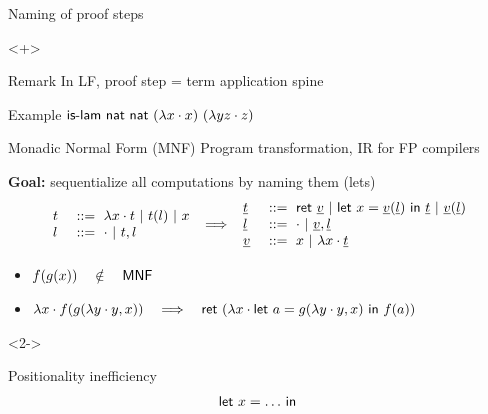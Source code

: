\documentclass[ignorenonframetext,red]{beamer}
\begin{document}
\begin{frame}{Naming of proof steps}
  \begin{onlyenv}<+>
    \begin{block}{Remark}
      In LF, proof step = term application spine

      \textcolor{green!50!black}{Example} $ \text{\textsf{is-lam}}\
      \mathsf{nat}\ \mathsf{nat}\ (\lambda{x}\cdot x)\ (\lambda{y z}\cdot z) $
    \end{block}

    \begin{block}{Monadic Normal Form (\textsf{MNF})}
      Program transformation, IR for FP compilers

      \textbf{Goal:} sequentialize all computations by naming them
      (\textsf{let}s)
      \[
      \inXLF
      \begin{array}{ll}
        \mo &\gequal \ulam\mv\mo \gor \lapp\mo\ma \gor \mv \\
        \ma &\gequal \lnil \gor \lcons\mo\ma \\
      \end{array}
      \ \Longrightarrow\ \inXLFa
      \begin{array}{ll}
        \mo &\gequal \ret\mval \gor \letb\mv{\lapp\mval\ma}\mo \gor \lapp\mval\ma \\
        \ma &\gequal \lnil \gor \lcons\mval\ma \\
        \mval &\gequal \mv \gor \ulam\mv\mo
      \end{array}
      \]
      \begin{examples}
        \begin{itemize}
        \item $\inXLFa \lapp f {\lapp g {\lsing x}} \quad\notin\quad
          \mathsf{MNF}$
        \item $\lambda{x}\cdot {f}({{{g}({{\lambda{y}\cdot
                  y},{{x}}})}}) \quad\Longrightarrow\quad
          \textsf{ret}\ {(\lambda{x}\cdot \mathsf{let}\ {a}={{{g}({{\lambda{y}\cdot y},{{x}}})}}\ \mathsf{in}\  {f}({{a}}))} $
        \end{itemize}
      \end{examples}
    \end{block}
  \end{onlyenv}
  \begin{onlyenv}<2->
    \begin{block}{Positionality inefficiency}
      \inXLFa
      \[
      \begin{array}{l}
        \mathsf{let}\ {x}={\ldots}\ \mathsf{in}\  \\

\end{array}\]
\end{block}
\end{onlyenv}
\end{frame}
\end{document}
